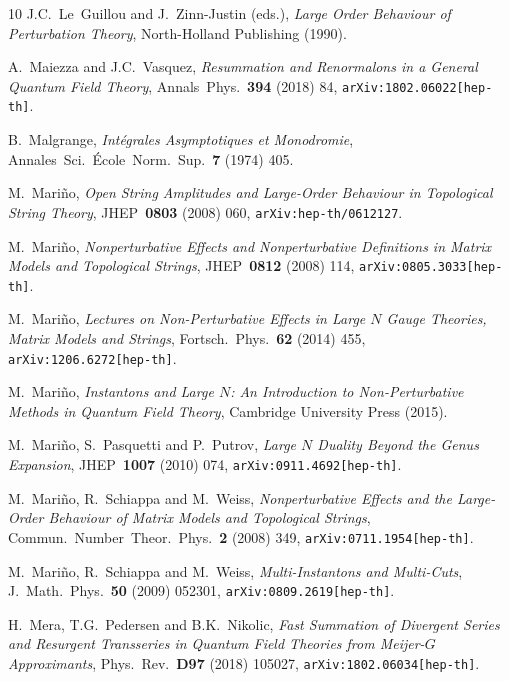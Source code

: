 \documentclass[11pt,a4paper]{article}
\begin{document}
\begin{thebibliography}{10}
J.C.~Le~Guillou and J.~Zinn-Justin (eds.),
\textit{Large Order Behaviour of Perturbation Theory},
North-Holland Publishing (1990).

A.~Maiezza and J.C.~Vasquez,
\textit{Resummation and Renormalons in a General Quantum Field Theory},
Annals\ Phys.\ \textbf{394} (2018) 84,
\texttt{arXiv:1802.06022[hep-th]}.

B.~Malgrange,
\textit{Int\'egrales Asymptotiques et Monodromie},
Annales\ Sci.\ \'Ecole\ Norm.\ Sup.\ \textbf{7} (1974) 405.

M.~Mari\~no,
\textit{Open String Amplitudes and Large-Order Behaviour in Topological String Theory},
JHEP\ \textbf{0803} (2008) 060,
\texttt{arXiv:hep-th/0612127}.

M.~Mari\~no,
\textit{Nonperturbative Effects and Nonperturbative Definitions in Matrix Models and Topological Strings},
JHEP\ \textbf{0812} (2008) 114,
\texttt{arXiv:0805.3033[hep-th]}.

M.~Mari\~no,
\textit{Lectures on Non-Perturbative Effects in Large $N$ Gauge Theories, Matrix Models and Strings},
Fortsch.\ Phys.\ \textbf{62} (2014) 455,
\texttt{arXiv:1206.6272[hep-th]}.

M.~Mari\~no,
\textit{Instantons and Large $N$: An Introduction to Non-Perturbative Methods in Quantum Field Theory},
Cambridge University Press (2015).

M.~Mari\~no, S.~Pasquetti and P.~Putrov,
\textit{Large $N$ Duality Beyond the Genus Expansion},
JHEP\ \textbf{1007} (2010) 074,
\texttt{arXiv:0911.4692[hep-th]}.

M.~Mari\~no, R.~Schiappa and M.~Weiss,
\textit{Nonperturbative Effects and the Large-Order Behaviour of Matrix Models and Topological Strings},
Commun.\ Number\ Theor.\ Phys.\ \textbf{2} (2008) 349,
\texttt{arXiv:0711.1954[hep-th]}.

M.~Mari\~no, R.~Schiappa and M.~Weiss,
\textit{Multi-Instantons and Multi-Cuts},
J.\ Math.\ Phys.\ \textbf{50} (2009) 052301,
\texttt{arXiv:0809.2619[hep-th]}.

H.~Mera, T.G.~Pedersen and B.K.~Nikolic,
\textit{Fast Summation of Divergent Series and Resurgent Transseries in Quantum Field Theories from Meijer-$G$ Approximants},
Phys.\ Rev.\ \textbf{D97} (2018) 105027,
\texttt{arXiv:1802.06034[hep-th]}.


\end{thebibliography}
\end{document}
